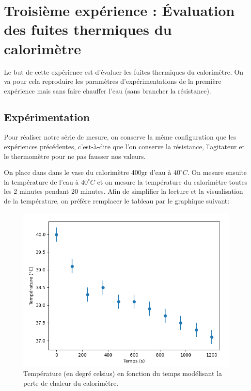 \documentclass[12pt]{article}
\begin{document}
\section{Troisième expérience : Évaluation des fuites thermiques du calorimètre}
Le but de cette expérience est d'évaluer les fuites thermiques du calorimètre. On va pour cela reproduire les paramètres d'expérimentations de la première expérience mais sans faire chauffer l'eau (sans brancher la résistance).
\subsection{Expérimentation}

Pour réaliser notre série de mesure, on conserve la même configuration que les expériences précédentes, c'est-à-dire
que l'on conserve la résistance, l'agitateur et le thermomètre pour ne pas fausser nos valeurs. 

On place dans dans le vase du calorimètre 400gr d'eau à $40^\circ C$. On mesure ensuite la température de l'eau à $40^\circ C$ et on mesure la température du calorimètre toutes les 2 minutes pendant 20 minutes.
Afin de simplifier la lecture et la visualisation de la température, on préfère remplacer le tableau par le graphique suivant:

\begin{figure}[h!]
	\begin{center}
		\includegraphics[scale=0.64]{img/Figure_2.png}
	\end{center}
	\label{fig:graph2}
	\caption{Température (en degré celsius) en fonction du temps modélisant la perte de chaleur du calorimètre.}
\end{figure}
\end{document}
